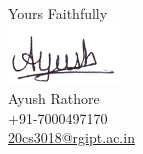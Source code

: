 \documentclass[letterpaper,12pt]{article}
\begin{document}

\vspace{0.5cm}
\raggedright
Yours Faithfully \\ {\vspace{-10pt}} \includegraphics[width=3cm]{sign.png} \\ Ayush Rathore \\ +91-7000497170 \\ \href{mailto:youremail@email.com}{20cs3018@rgipt.ac.in}
\end{document}
